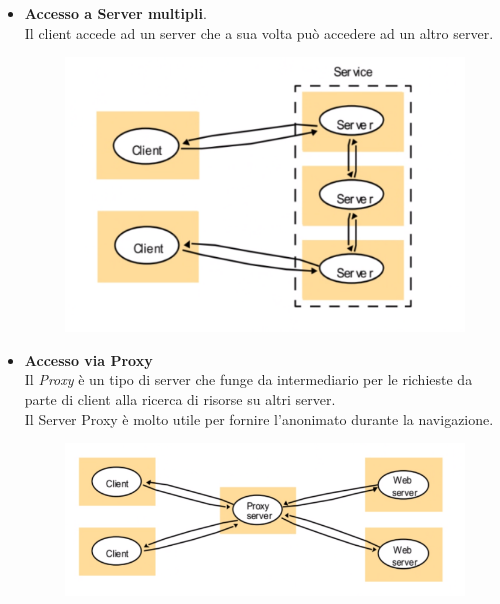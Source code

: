 \documentclass[12pt, a4paper]{article}
\begin{document}
    \begin{itemize}
        \item \textbf{Accesso a Server multipli}.
        \\Il client accede ad un server che a sua volta può accedere ad un altro
        server. 
        \begin{figure}[htbp]
            \centering
            \includegraphics[scale=0.5]{servermultipli.png}  
        \end{figure}
        \newpage
        \item \textbf{Accesso via Proxy}
        \\Il \textit{Proxy} è un tipo di server che funge da intermediario per le richieste
        da parte di client alla ricerca di risorse su altri server.
        \\Il Server Proxy è molto utile per fornire l'anonimato durante la navigazione.
        \begin{figure}[htbp]
            \centering
            \includegraphics[scale=0.5]{proxy.png}  
        \end{figure}
    \end{itemize}
    
\end{document}
